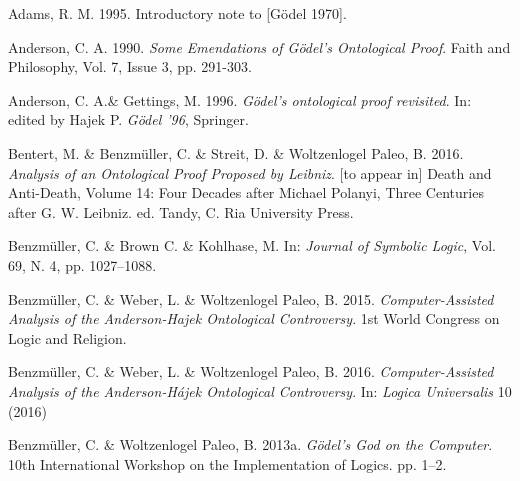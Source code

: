\documentclass[smallextended]{svjour3}
\begin{document}
\begin{thebibliography}{9}

Adams, R. M. 1995. Introductory note to [G\"odel 1970]. 

Anderson, C. A. 1990. {\itshape Some Emendations of G\"odel's Ontological Proof}. Faith and Philosophy, Vol. 7, Issue 3, pp. 291-303. 

Anderson, C. A.\& Gettings, M. 1996.  {\itshape G\"odel's ontological proof revisited}. In: edited by Hajek P. {\itshape G\"odel '96},  Springer. 

Bentert, M. \& Benzm\"uller, C. \& Streit, D. \& Woltzenlogel Paleo, B. 2016. {\itshape Analysis of an Ontological Proof Proposed by Leibniz}. [to appear in]  Death and Anti-Death, Volume 14: Four Decades after Michael Polanyi, Three Centuries after G. W. Leibniz. ed. Tandy, C. Ria University Press. 

Benzm\"uller, C. \& Brown C. \& Kohlhase, M. In: {\itshape Journal of Symbolic Logic}, Vol. 69, N. 4, pp. 1027--1088.

Benzm\"uller, C. \& Weber, L. \& Woltzenlogel Paleo, B. 2015. {\itshape Computer-Assisted Analysis of the Anderson-Hajek Ontological Controversy}. 1st World Congress on Logic and Religion. 

Benzm\"uller, C. \& Weber, L. \& Woltzenlogel Paleo, B. 2016. {\itshape Computer-Assisted Analysis of the Anderson-H\'ajek Ontological Controversy}. In: {\itshape Logica Universalis} 10 (2016)


Benzm\"uller, C. \& Woltzenlogel Paleo, B. 2013a. {\itshape G{\"{o}}del's God on the Computer}. 10th International Workshop on the Implementation of Logics. pp. 1--2.


\end{thebibliography}
\end{document}
